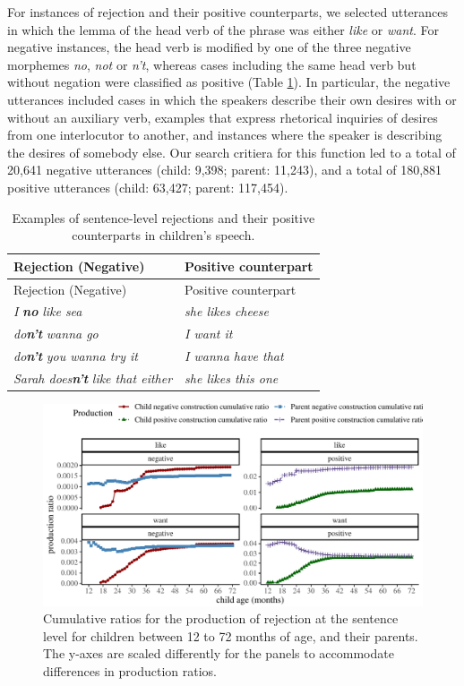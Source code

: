 \documentclass[
  man,floatsintext]{apa6}
\begin{document}
For instances of rejection and their positive counterparts, we selected utterances in which the lemma of the head verb of the phrase was either \emph{like} or \emph{want}. For negative instances, the head verb is modified by one of the three negative morphemes \emph{no}, \emph{not} or \emph{n't}, whereas cases including the same head verb but without negation were classified as positive (Table \ref{tab:rejection}). In particular, the negative utterances included cases in which the speakers describe their own desires with or without an auxiliary verb, examples that express rhetorical inquiries of desires from one interlocutor to another, and instances where the speaker is describing the desires of somebody else. Our search critiera for this function led to a total of 20,641 negative utterances (child: 9,398; parent: 11,243), and a total of 180,881 positive utterances (child: 63,427; parent: 117,454).

\begin{longtable}[]{@{}ll@{}}
\caption{\label{tab:rejection} Examples of sentence-level rejections and their positive counterparts in children's speech.}\tabularnewline
\toprule\noalign{}
Rejection (Negative) & Positive counterpart \\
\midrule\noalign{}
\endfirsthead
\toprule\noalign{}
Rejection (Negative) & Positive counterpart \\
\midrule\noalign{}
\endhead
\bottomrule\noalign{}
\endlastfoot
\emph{I} \textbf{\emph{no}} \emph{like sea} & \emph{she likes cheese} \\
\emph{do\textbf{n't}} \emph{wanna go} & \emph{I want it} \\
\emph{do\textbf{n't}} \emph{you wanna try it} & \emph{I wanna have that} \\
\emph{Sarah does\textbf{n't}} \emph{like that either} & \emph{she likes this one} \\
\end{longtable}

\begin{figure}[H]

{\centering \includegraphics{neg_construction_article_files/figure-latex/emotion-1} 

}

\caption{Cumulative ratios for the production of rejection at the sentence level for children between 12 to 72 months of age, and their parents. The y-axes are scaled differently for the panels to accommodate differences in production ratios.}\label{fig:emotion}
\end{figure}
\end{document}

